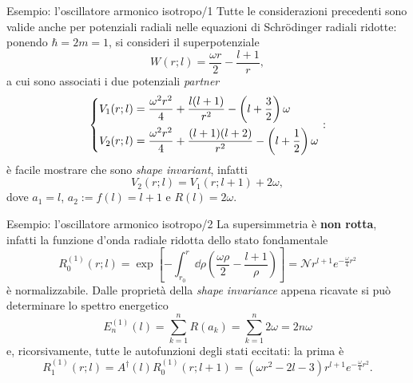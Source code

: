 \documentclass[11pt,aspectratio=169,handout]{beamer}
\begin{document}
\begin{frame}{Esempio: l'oscillatore armonico isotropo/1}
    Tutte le considerazioni precedenti sono valide anche per potenziali radiali
    nelle equazioni di Schrödinger radiali ridotte: ponendo 
    $\hbar = 2m = 1$, si consideri il superpotenziale
    $$W(r;l)=\frac{\omega r}{2}-\frac{l+1}{r},$$
    a cui sono associati i due potenziali \textit{partner}
    \begin{equation*}
        \begin{dcases}
            V_1(r;l)=\frac{\omega^2r^2}{4}+\frac{l(l+1)}{r^2}-\left(l+\frac{3}{2}
            \right)\omega\\
            V_2(r;l)=\frac{\omega^2r^2}{4}+\frac{(l+1)(l+2)}{r^2}-\left(l+
            \frac{1}{2}\right)\omega
        \end{dcases}:
    \end{equation*}
    è facile mostrare che sono \textit{shape invariant}, infatti
    $$V_2(r;l) = V_1(r;l+1)+2\omega,$$
    dove $a_1=l$, $a_2:=f(l)=l+1$ e $R(l)=2\omega$.
\end{frame}
\begin{frame}{Esempio: l'oscillatore armonico isotropo/2}
    La supersimmetria è \textbf{non rotta}, infatti la funzione d'onda radiale
    ridotta dello stato fondamentale
    $$
    R_0^{(1)}(r;l) = \exp\left[-\int_{r_0}^r \dd \rho \left(\frac{\omega\rho}{2}
    -\frac{l+1}{\rho}\right)\right] = \mathcal{N}r^{l+1}e^{-\frac{\omega}{4}r^2}
    $$
    è normalizzabile. Dalle proprietà della \textit{shape invariance} appena ricavate
    si può determinare lo spettro energetico
    $$
    E_n^{(1)}(l)=\sum_{k=1}^{n}R(a_k)=\sum_{k=1}^{n}2\omega = 2n\omega
    $$
    e, ricorsivamente, tutte le autofunzioni degli stati eccitati: la prima è
    $$
    R_1^{(1)}(r;l)=A^\dagger(l)R_0^{(1)}(r;l+1)=(\omega r^2-2l-3)r^{l+1}
    e^{-\frac{\omega}{4}r^2}.
    $$
\end{frame}
\end{document}
